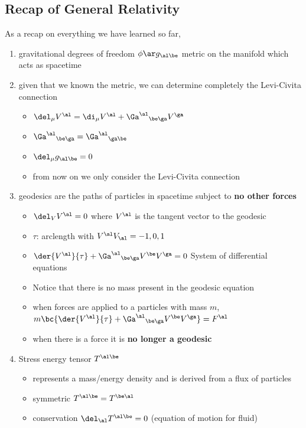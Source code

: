 \documentclass{article}
\begin{document}
\subsection{Recap of General Relativity}
As a recap on everything we have learned so far,
\begin{enumerate}
    \item gravitational degrees of freedom $\phi \ar g_{\al\be}$ metric on the manifold which acts as spacetime
    \item given that we known the metric, we can determine completely the Levi-Civita connection
    \begin{itemize}
        \item $\del_\mu V^\al = \di_\mu V^\al + {\Ga^\al}_{\be\ga}V^\ga$
        \item ${\Ga^\al}_{\be\ga} = {\Ga^\al}_{\ga\be}$
        \item $\del_\mu g_{\al\be} = 0$
        \item from now on we only consider the Levi-Civita connection
    \end{itemize}
    \item geodesics are the paths of particles in spacetime subject to \textbf{no other forces}
    \begin{itemize}
        \item $\del_V V^\al = 0$ where $V^\al$ is the tangent vector to the geodesic
        \item $\tau$: arclength with $V^\al V_\al = -1, 0, 1$
        \item $\der{V^\al}{\tau} + {\Ga^\al}_{\be\ga} V^\be V^\ga = 0$ System of differential equations
        \item Notice that there is no mass present in the geodesic equation
        \item when forces are applied to a particles with mass $m$, $m\bc{\der{V^\al}{\tau} + {\Ga^\al}_{\be\ga} V^\be V^\ga} = F^\al$
        \item when there is a force it is \textbf{no longer a geodesic}
    \end{itemize}
    \item Stress energy tensor $T^{\al\be}$
    \begin{itemize}
        \item represents a mass/energy density and is derived from a flux of particles
        \item symmetric $T^{\al\be} = T^{\be\al}$
        \item conservation $\del_\al T^{\al\be} = 0$ (equation of motion for fluid)

\end{itemize}
\end{enumerate}
\end{document}
